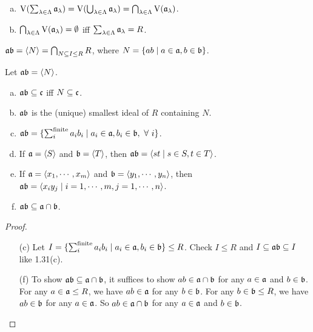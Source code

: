 \begin{fact}
    \begin{enumerate}[(a)]
        \item $\operatorname{V}(\sum_{\lambda \in \Lambda} \mathfrak{a}_\lambda) = \operatorname{V}(\bigcup_{\lambda \in \Lambda} \mathfrak{a}_\lambda) = \bigcap_{\lambda \in \Lambda} \operatorname{V}(\mathfrak{a}_\lambda)$.
        \item $\bigcap_{\lambda \in \Lambda} \operatorname{V}(\mathfrak{a}_\lambda) = \emptyset$ iff $\sum_{\lambda \in \Lambda} \mathfrak{a}_\lambda = R$.
    \end{enumerate}
\end{fact}

\begin{definition}
    $\mathfrak{a} \mathfrak{b} = \langle N \rangle = \bigcap_{N \subseteq I \leq R}R$, where $N = \{ab \mid a \in \mathfrak{a},b \in \mathfrak{b}\}$. 
\end{definition}

\begin{fact}
    Let $\mathfrak{a} \mathfrak{b} = \langle N \rangle$.
    \begin{enumerate}[(a)]
        \item $\mathfrak{a} \mathfrak{b} \subseteq \mathfrak{c}$ iff $N \subseteq \mathfrak{c}$.
        \item $\mathfrak{a} \mathfrak{b}$ is the (unique) smallest ideal of $R$ containing $N$.
        \item $\mathfrak{a}\mathfrak{b} = \{\sum_{i}^{\text{finite}}a_ib_i \mid a_i \in \mathfrak{a},b_i \in \mathfrak{b},\ \forall \  i\}$.
        \item If $\mathfrak{a} = \langle S \rangle$ and $\mathfrak{b} = \langle T \rangle$, then $\mathfrak{a}\mathfrak{b} = \langle st \mid s \in S, t \in T\rangle$.
        \item If $\mathfrak{a} = \langle x_1,\cdots,x_m \rangle$ and $\mathfrak{b} = \langle y_1,\cdots,y_n \rangle$, then $\mathfrak{a}\mathfrak{b} = \langle x_iy_j \mid i = 1,\cdots,m,j = 1,\cdots,n \rangle$.
        \item $\mathfrak{a} \mathfrak{b} \subseteq \mathfrak{a} \cap \mathfrak{b}$.
    \end{enumerate}
\end{fact}

\begin{proof}
    \begin{enumerate}
        \item [(c)]
            Let $I = \{\sum_{i}^{\text{finite}} a_ib_i \mid a_i \in \mathfrak{a},b_i \in \mathfrak{b}\} \leq R$. Check $I \leq R$ and $I \subseteq \mathfrak{a} \mathfrak{b} \subseteq I$ like 1.31(c).
        \item [(f)]
            To show $\mathfrak{a} \mathfrak{b} \subseteq \mathfrak{a} \cap \mathfrak{b}$, it suffices to show $ab \in \mathfrak{a} \cap \mathfrak{b}$ for any $a \in \mathfrak{a}$ and $b \in \mathfrak{b}$. For any $a \in \mathfrak{a} \leq R$, we have $ab \in \mathfrak{a}$ for any $b \in \mathfrak{b}$. For any $b \in \mathfrak{b} \leq R$, we have $ab \in \mathfrak{b}$ for any $a \in \mathfrak{a}$. So $ab \in \mathfrak{a} \cap \mathfrak{b}$ for any $a \in \mathfrak{a}$ and $b \in \mathfrak{b}$.
    \end{enumerate}
\end{proof}

